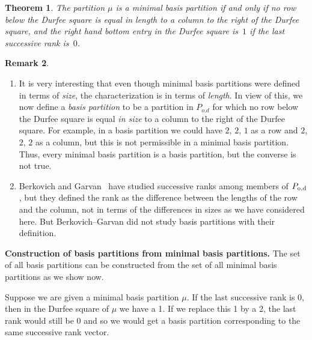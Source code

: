 \documentclass[pdftex]{sigma}
\numberwithin{equation}{section}
\newtheorem{Theorem}{Theorem}[section]
\theoremstyle{definition}
\newtheorem{Remark}[Theorem]{Remark}
\begin{document}
\begin{Theorem}%
The partition $\mu$ is a minimal basis partition if and only if
no row below the Durfee square is equal in length
to a column to the right of the Durfee square, and the right hand
bottom entry in the Durfee square is~$1$ if the last successive rank is~$0$.
\end{Theorem}

\begin{Remark}\quad
\begin{enumerate}\itemsep=0pt
\item[$(1)$] It is very interesting that even though minimal basis
partitions were defined in terms of {\it size}, the characterization is
in terms of {\it length}. In view of this, we now define a
{\it basis partition} to be a partition in $P_{o.d}$ for which no row
below the Durfee square is equal \textit{in size} to a column to the right of
the Durfee square. For example, in a basis partition we could have
$2$, $2$, $1$ as a row and $2$, $2$, $2$ as a column, but this is not permissible in a minimal
basis partition. Thus, every minimal basis partition is a basis partition, but
the converse is not true.

\item[$(2)$] Berkovich and Garvan~\cite{Be-Ga02} have studied successive ranks among members of $P_{\rm o,d}$, but they defined the rank as the difference between the lengths of the row and the column, not in terms of the differences in sizes as we have considered here. But Berkovich--Garvan did not study basis partitions with their definition.
\end{enumerate}
\end{Remark}


{\bf Construction of basis partitions from minimal basis
partitions.}
The set of all basis partitions can be constructed from the set of all
minimal basis partitions as we show now.

Suppose we are given a minimal basis partition $\mu$. If the last successive
rank is 0, then in the Durfee square of $\mu$ we have a 1. If we replace
this 1 by a 2, the last rank would still be 0 and so we would get a basis
partition corresponding to the same successive rank vector.
\end{document}
